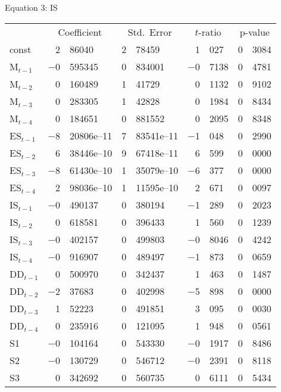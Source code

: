\documentclass[11pt]{article}
\begin{document}
\begin{center}

Equation 3: IS\\

\vspace{1em}

\begin{tabular}{lr@{.}lr@{.}lr@{.}lr@{.}l}
  &
 \multicolumn{2}{c}{Coefficient} &
  \multicolumn{2}{c}{Std.\ Error} &
   \multicolumn{2}{c}{$t$-ratio} &
    \multicolumn{2}{c}{p-value} \\[1ex]
const &
  2&86040 &
    2&78459 &
      1&027 &
        0&3084 \\
M$_{t-1}$ &
  $-$0&595345 &
    0&834001 &
      $-$0&7138 &
        0&4781 \\
M$_{t-2}$ &
  0&160489 &
    1&41729 &
      0&1132 &
        0&9102 \\
M$_{t-3}$ &
  0&283305 &
    1&42828 &
      0&1984 &
        0&8434 \\
M$_{t-4}$ &
  0&184651 &
    0&881552 &
      0&2095 &
        0&8348 \\
ES$_{t-1}$ &
  $-$8&20806\textrm{e--11} &
    7&83541\textrm{e--11} &
      $-$1&048 &
        0&2990 \\
ES$_{t-2}$ &
  6&38446\textrm{e--10} &
    9&67418\textrm{e--11} &
      6&599 &
        0&0000 \\
ES$_{t-3}$ &
  $-$8&61430\textrm{e--10} &
    1&35079\textrm{e--10} &
      $-$6&377 &
        0&0000 \\
ES$_{t-4}$ &
  2&98036\textrm{e--10} &
    1&11595\textrm{e--10} &
      2&671 &
        0&0097 \\
IS$_{t-1}$ &
  $-$0&490137 &
    0&380194 &
      $-$1&289 &
        0&2023 \\
IS$_{t-2}$ &
  0&618581 &
    0&396433 &
      1&560 &
        0&1239 \\
IS$_{t-3}$ &
  $-$0&402157 &
    0&499803 &
      $-$0&8046 &
        0&4242 \\
IS$_{t-4}$ &
  $-$0&916907 &
    0&489497 &
      $-$1&873 &
        0&0659 \\
DD$_{t-1}$ &
  0&500970 &
    0&342437 &
      1&463 &
        0&1487 \\
DD$_{t-2}$ &
  $-$2&37683 &
    0&402998 &
      $-$5&898 &
        0&0000 \\
DD$_{t-3}$ &
  1&52223 &
    0&491851 &
      3&095 &
        0&0030 \\
DD$_{t-4}$ &
  0&235916 &
    0&121095 &
      1&948 &
        0&0561 \\
S1 &
  $-$0&104164 &
    0&543330 &
      $-$0&1917 &
        0&8486 \\
S2 &
  $-$0&130729 &
    0&546712 &
      $-$0&2391 &
        0&8118 \\
S3 &
  0&342692 &
    0&560735 &
      0&6111 &
        0&5434 \\
\end{tabular}


\end{center}
\end{document}
